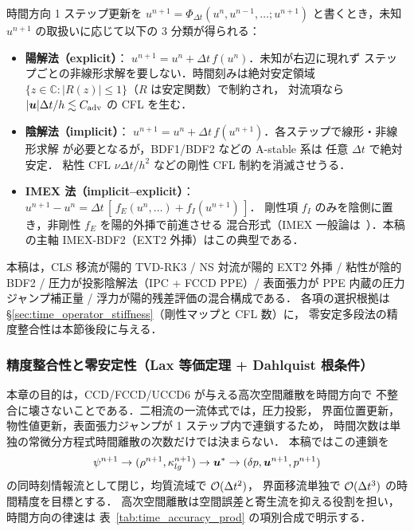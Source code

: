 時間方向 1 ステップ更新を $u^{n+1} = \Phi_{\Delta t}(u^n, u^{n-1}, \ldots; u^{n+1})$
と書くとき，未知 $u^{n+1}$ の取扱いに応じて以下の 3 分類が得られる：
\begin{itemize}[leftmargin=2em]
  \item \textbf{陽解法（explicit）}：
        $u^{n+1} = u^n + \Delta t\,f(u^n)$．未知が右辺に現れず
        ステップごとの非線形求解を要しない．時間刻みは絶対安定領域
        $\{z\in\mathbb{C} : |R(z)|\le 1\}$（$R$ は安定関数）で制約され，
        対流項なら $|\bm{u}|\Delta t/h\lesssim C_{\mathrm{adv}}$ の CFL を生む．
  \item \textbf{陰解法（implicit）}：
        $u^{n+1} = u^n + \Delta t\,f(u^{n+1})$．各ステップで線形・非線形求解
        が必要となるが，BDF1/BDF2 などの A-stable 系は
        任意 $\Delta t$ で絶対安定．
        粘性 CFL $\nu\Delta t/h^2$ などの剛性 CFL 制約を消滅させうる．
  \item \textbf{IMEX 法（implicit--explicit）}：
        $u^{n+1} - u^n = \Delta t\,[\,f_E(u^n,\ldots) + f_I(u^{n+1})\,]$．
        剛性項 $f_I$ のみを陰側に置き，非剛性 $f_E$ を陽的外挿で前進させる
        混合形式（IMEX 一般論は~\cite{AscherRuuthSpiteri1997,AscherRuuthWetton1995}）．本稿の主軸 IMEX-BDF2（EXT2 外挿）はこの典型である．
\end{itemize}
本稿は，CLS 移流が陽的 TVD-RK3 / NS 対流が陽的 EXT2 外挿 /
粘性が陰的 BDF2 / 圧力が投影陰解法（IPC + FCCD PPE）/ 表面張力が
PPE 内蔵の圧力ジャンプ補正量 / 浮力が陽的残差評価の混合構成である．
各項の選択根拠は §\ref{sec:time_operator_stiffness}（剛性マップと CFL 数）に，
零安定多段法の精度整合性は本節後段に与える．

\subsubsection*{精度整合性と零安定性（Lax 等価定理 + Dahlquist 根条件）}
\label{sec:time_accuracy_lax}

本章の目的は，CCD/FCCD/UCCD6 が与える高次空間離散を時間方向で
不整合に壊さないことである．二相流の一流体式では，圧力投影，
界面位置更新，物性値更新，表面張力ジャンプが 1 ステップ内で連鎖するため，
時間次数は単独の常微分方程式時間離散の次数だけでは決まらない．
本稿ではこの連鎖を
\[
  \psi^{n+1}\to (\rho^{n+1},\kappa_{lg}^{n+1})
  \to \bm{u}^* \to (\delta p,\bm{u}^{n+1},p^{n+1})
\]
の同時刻情報流として閉じ，均質流域で $\mathcal{O}(\Delta t^2)$，
界面移流単独で $\mathcal{O}(\Delta t^3)$ の時間精度を目標とする．
高次空間離散は空間誤差と寄生流を抑える役割を担い，時間方向の律速は
表~\ref{tab:time_accuracy_prod} の項別合成で明示する．

